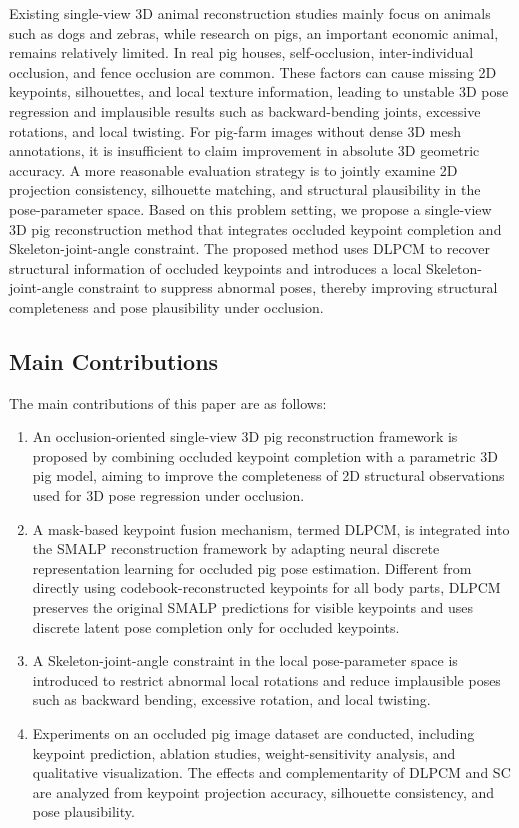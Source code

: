 \documentclass[runningheads]{llncs}
\begin{document}
Existing single-view 3D animal reconstruction studies mainly focus on animals such as dogs and zebras, while research on pigs, an important economic animal, remains relatively limited. In real pig houses, self-occlusion, inter-individual occlusion, and fence occlusion are common. These factors can cause missing 2D keypoints, silhouettes, and local texture information, leading to unstable 3D pose regression and implausible results such as backward-bending joints, excessive rotations, and local twisting. For pig-farm images without dense 3D mesh annotations, it is insufficient to claim improvement in absolute 3D geometric accuracy. A more reasonable evaluation strategy is to jointly examine 2D projection consistency, silhouette matching, and structural plausibility in the pose-parameter space. Based on this problem setting, we propose a single-view 3D pig reconstruction method that integrates occluded keypoint completion and Skeleton-joint-angle constraint. The proposed method uses DLPCM to recover structural information of occluded keypoints and introduces a local Skeleton-joint-angle constraint to suppress abnormal poses, thereby improving structural completeness and pose plausibility under occlusion.

\subsection{Main Contributions}

The main contributions of this paper are as follows:

\begin{enumerate}
\item An occlusion-oriented single-view 3D pig reconstruction framework is proposed by combining occluded keypoint completion with a parametric 3D pig model, aiming to improve the completeness of 2D structural observations used for 3D pose regression under occlusion.

\item A mask-based keypoint fusion mechanism, termed DLPCM, is integrated into the SMALP reconstruction framework by adapting neural discrete representation learning for occluded pig pose estimation. Different from directly using codebook-reconstructed keypoints for all body parts, DLPCM preserves the original SMALP predictions for visible keypoints and uses discrete latent pose completion only for occluded keypoints.

\item A Skeleton-joint-angle constraint in the local pose-parameter space is introduced to restrict abnormal local rotations and reduce implausible poses such as backward bending, excessive rotation, and local twisting.

\item Experiments on an occluded pig image dataset are conducted, including keypoint prediction, ablation studies, weight-sensitivity analysis, and qualitative visualization. The effects and complementarity of DLPCM and SC are analyzed from keypoint projection accuracy, silhouette consistency, and pose plausibility.
\end{enumerate}
\end{document}
